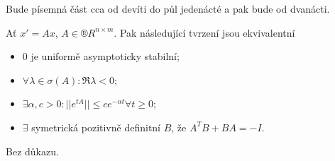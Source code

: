 \documentclass[12pt]{article}					%
\begin{document}
\begin{poznamka}[Zkouška]
	Bude písemná část cca od devíti do půl jedenácté a pak bude od dvanácti.
\end{poznamka}

\begin{veta}
	Ať $x' = Ax$, $A \in ®R^{n \times m}$. Pak následující tvrzení jsou ekvivalentní

	\begin{itemize}
		\item 0 je uniformě asymptoticky stabilní;
		\item $\forall \lambda \in \sigma(A): \Re \lambda < 0$;
		\item $\exists \alpha, c > 0: ||e^{tA}|| ≤ c e^{-\alpha t} \forall t ≥ 0$;
		\item $\exists$ symetrická pozitivně definitní $B$, že $A^TB + BA = -I$.
	\end{itemize}

	\begin{dukazin}
		Bez důkazu.
	\end{dukazin}
\end{veta}
\end{document}
